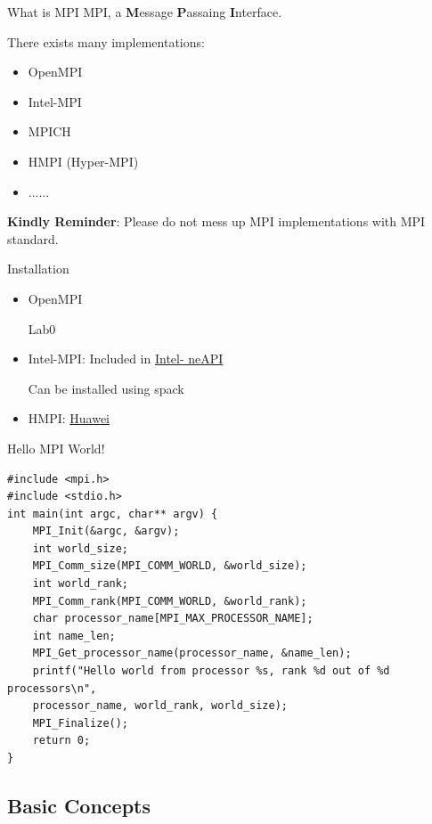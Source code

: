 \begin{frame}{What is MPI}
    MPI, a \alert{\textbf{M}}essage \alert{\textbf{P}}assaing \alert{\textbf{I}}nterface.

    There exists many implementations:
    \begin{itemize}
        \item OpenMPI
        \item Intel-MPI
        \item MPICH
        \item HMPI (Hyper-MPI)
        \item ......
    \end{itemize}

    \textbf{Kindly Reminder}: Please do not mess up MPI implementations with MPI standard.
\end{frame}


\begin{frame}{Installation}
    \begin{itemize}
        \item OpenMPI
        
            Lab0
        \item Intel-MPI: Included in \href{https://www.intel.cn/content/www/cn/zh/developer/tools/oneapi/toolkits.html}{Intel- neAPI}
        
            Can be installed using spack

        \item HMPI: \href{https://support.huawei.com/enterprise/zh/doc/EDOC1100228708/c5d7ef16}{Huawei}
    \end{itemize}
\end{frame}

\begin{frame}[fragile]{Hello MPI World!}
    \begin{verbatim}
#include <mpi.h>
#include <stdio.h>
int main(int argc, char** argv) {
    MPI_Init(&argc, &argv);
    int world_size;
    MPI_Comm_size(MPI_COMM_WORLD, &world_size);
    int world_rank;
    MPI_Comm_rank(MPI_COMM_WORLD, &world_rank);
    char processor_name[MPI_MAX_PROCESSOR_NAME];
    int name_len;
    MPI_Get_processor_name(processor_name, &name_len);
    printf("Hello world from processor %s, rank %d out of %d processors\n",
    processor_name, world_rank, world_size);
    MPI_Finalize();
    return 0;
}
    \end{verbatim}
\end{frame}

\subsection{Basic Concepts}

